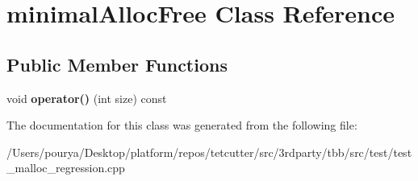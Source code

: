 \hypertarget{classminimalAllocFree}{}\section{minimal\+Alloc\+Free Class Reference}
\label{classminimalAllocFree}
\subsection*{Public Member Functions}
\begin{DoxyCompactItemize}
\item 
\hypertarget{classminimalAllocFree_aca4cf01c6732812e0ec2a59d6ca7e5ab}{}void {\bfseries operator()} (int size) const \label{classminimalAllocFree_aca4cf01c6732812e0ec2a59d6ca7e5ab}

\end{DoxyCompactItemize}


The documentation for this class was generated from the following file\+:\begin{DoxyCompactItemize}
\item 
/\+Users/pourya/\+Desktop/platform/repos/tetcutter/src/3rdparty/tbb/src/test/test\+\_\+malloc\+\_\+regression.\+cpp\end{DoxyCompactItemize}
